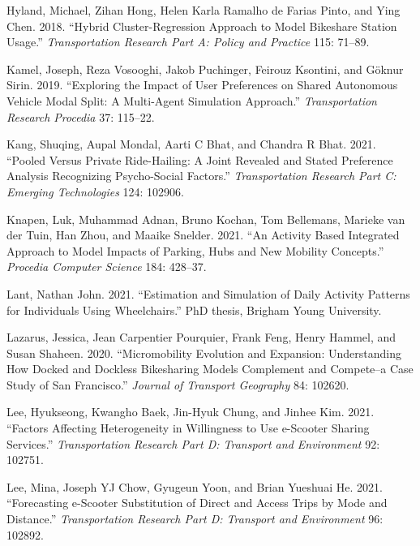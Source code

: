 \documentclass[12pt, oneside, openright]{byuthesis}
\newlength{\cslhangindent}
\newlength{\cslentryspacingunit} %
\newenvironment{CSLReferences}[2] %
 {%
  \setlength{\parindent}{0pt}
  \ifodd #1
  \let\oldpar\par
  \def\par{\hangindent=\cslhangindent\oldpar}
  \fi
  \setlength{\parskip}{#2\cslentryspacingunit}
 }%
 {}
\begin{document}
\begin{CSLReferences}{1}{0}
\leavevmode{}%
Hyland, Michael, Zihan Hong, Helen Karla Ramalho de Farias Pinto, and Ying Chen. 2018. {``Hybrid Cluster-Regression Approach to Model Bikeshare Station Usage.''} \emph{Transportation Research Part A: Policy and Practice} 115: 71--89.

\leavevmode{}%
Kamel, Joseph, Reza Vosooghi, Jakob Puchinger, Feirouz Ksontini, and Göknur Sirin. 2019. {``Exploring the Impact of User Preferences on Shared Autonomous Vehicle Modal Split: A Multi-Agent Simulation Approach.''} \emph{Transportation Research Procedia} 37: 115--22.

\leavevmode{}%
Kang, Shuqing, Aupal Mondal, Aarti C Bhat, and Chandra R Bhat. 2021. {``Pooled Versus Private Ride-Hailing: A Joint Revealed and Stated Preference Analysis Recognizing Psycho-Social Factors.''} \emph{Transportation Research Part C: Emerging Technologies} 124: 102906.

\leavevmode{}%
Knapen, Luk, Muhammad Adnan, Bruno Kochan, Tom Bellemans, Marieke van der Tuin, Han Zhou, and Maaike Snelder. 2021. {``An Activity Based Integrated Approach to Model Impacts of Parking, Hubs and New Mobility Concepts.''} \emph{Procedia Computer Science} 184: 428--37.

\leavevmode{}%
Lant, Nathan John. 2021. {``Estimation and Simulation of Daily Activity Patterns for Individuals Using Wheelchairs.''} PhD thesis, Brigham Young University.

\leavevmode{}%
Lazarus, Jessica, Jean Carpentier Pourquier, Frank Feng, Henry Hammel, and Susan Shaheen. 2020. {``Micromobility Evolution and Expansion: Understanding How Docked and Dockless Bikesharing Models Complement and Compete--a Case Study of San Francisco.''} \emph{Journal of Transport Geography} 84: 102620.

\leavevmode{}%
Lee, Hyukseong, Kwangho Baek, Jin-Hyuk Chung, and Jinhee Kim. 2021. {``Factors Affecting Heterogeneity in Willingness to Use e-Scooter Sharing Services.''} \emph{Transportation Research Part D: Transport and Environment} 92: 102751.

\leavevmode{}%
Lee, Mina, Joseph YJ Chow, Gyugeun Yoon, and Brian Yueshuai He. 2021. {``Forecasting e-Scooter Substitution of Direct and Access Trips by Mode and Distance.''} \emph{Transportation Research Part D: Transport and Environment} 96: 102892.


\end{CSLReferences}
\end{document}
